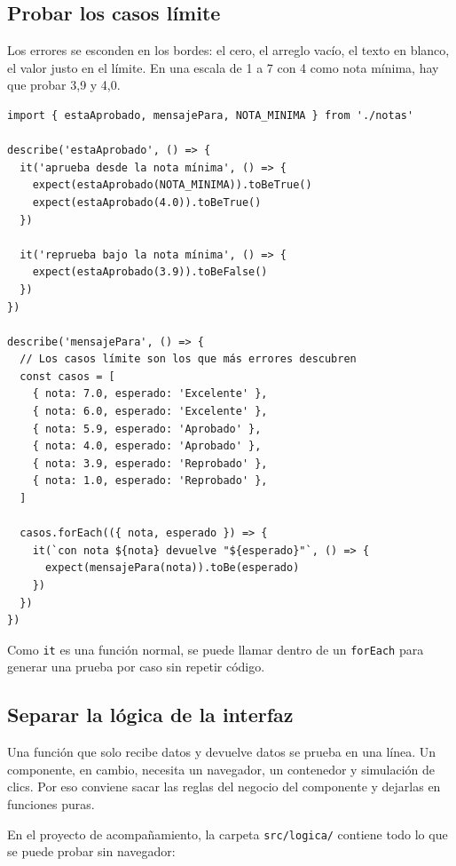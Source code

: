 \documentclass[11pt,a4paper]{article}
\newcommand{\cmd}[1]{\texttt{\color{reactdark}#1}}
\begin{document}
\subsection{Probar los casos límite}

Los errores se esconden en los bordes: el cero, el arreglo vacío, el texto en blanco, el valor justo en el límite. En una escala de 1 a 7 con 4 como nota mínima, hay que probar 3,9 y 4,0.

\begin{lstlisting}[language=JSX,title={\small\ttfamily src/logica/notas.spec.js}]
import { estaAprobado, mensajePara, NOTA_MINIMA } from './notas'

describe('estaAprobado', () => {
  it('aprueba desde la nota mínima', () => {
    expect(estaAprobado(NOTA_MINIMA)).toBeTrue()
    expect(estaAprobado(4.0)).toBeTrue()
  })

  it('reprueba bajo la nota mínima', () => {
    expect(estaAprobado(3.9)).toBeFalse()
  })
})

describe('mensajePara', () => {
  // Los casos límite son los que más errores descubren
  const casos = [
    { nota: 7.0, esperado: 'Excelente' },
    { nota: 6.0, esperado: 'Excelente' },
    { nota: 5.9, esperado: 'Aprobado' },
    { nota: 4.0, esperado: 'Aprobado' },
    { nota: 3.9, esperado: 'Reprobado' },
    { nota: 1.0, esperado: 'Reprobado' },
  ]

  casos.forEach(({ nota, esperado }) => {
    it(`con nota ${nota} devuelve "${esperado}"`, () => {
      expect(mensajePara(nota)).toBe(esperado)
    })
  })
})
\end{lstlisting}

Como \cmd{it} es una función normal, se puede llamar dentro de un \cmd{forEach} para generar una prueba por caso sin repetir código.

\subsection{Separar la lógica de la interfaz}

Una función que solo recibe datos y devuelve datos se prueba en una línea. Un componente, en cambio, necesita un navegador, un contenedor y simulación de clics. Por eso conviene sacar las reglas del negocio del componente y dejarlas en funciones puras.

En el proyecto de acompañamiento, la carpeta \cmd{src/logica/} contiene todo lo que se puede probar sin navegador:
\end{document}
